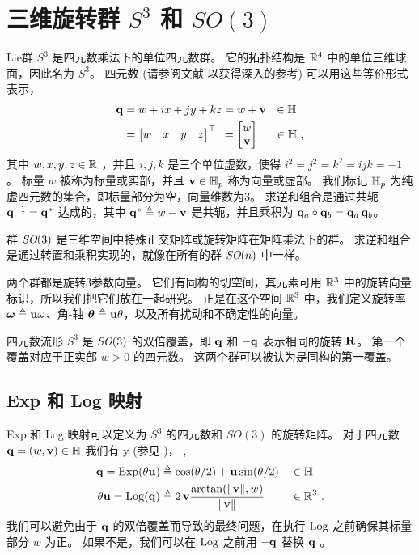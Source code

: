 
\section{三维旋转群 $S^3$ 和 $SO(3)$}
\label{sec:S3_SO3}

Lie群 $S^3$ 是四元数乘法下的单位四元数群。
它的拓扑结构是 ${\mathbb R}^4$ 中的单位三维球面，因此名为 $S^3$。
四元数 (请参阅文献 \cite{SOLA-17-Quaternion} 以获得深入的参考) 可以用这些等价形式表示，
%
\begin{align}
\begin{split}		
{\bf q} 
&= w+ix+jy+kz
=w+{\bf v} ~~ \in{\mathbb H}
\\
&
=\begin{bmatrix}w&x&y&z\end{bmatrix}^{\top} 
~\,=\begin{bmatrix}w\\{\bf v}\end{bmatrix} \quad~\, \in{\mathbb H}
~,
\end{split}
\end{align}
%
其中 $w,x,y,z\in{\mathbb R}$ ，并且 $i,j,k$ 是三个单位虚数，使得 $i^2=j^2=k^2=ijk=-1$ 。
标量 $w$ 被称为标量或实部，并且 ${\bf v}\in{\mathbb H}_p$ 称为向量或虚部。
我们标记 ${\mathbb H}_p$ 为纯虚四元数的集合，即标量部分为空，向量维数为3。
求逆和组合是通过共轭 ${\bf q}^{-1} = {\bf q}^*$ 达成的，其中 ${\bf q}^*\triangleq w-{\bf v}$ 是共轭，并且乘积为 ${\bf q}_a\circ{\bf q}_b = {\bf q}_a\,{\bf q}_b$。

群 $\textit{SO}(3)$ 是三维空间中特殊正交矩阵或旋转矩阵在矩阵乘法下的群。
求逆和组合是通过转置和乘积实现的，就像在所有的群 $\textit{SO}(n)$ 中一样。

两个群都是旋转$3$参数向量。 
它们有同构的切空间，其元素可用 ${\mathbb R}^3$ 中的旋转向量标识，所以我们把它们放在一起研究。
正是在这个空间 ${\mathbb R}^3$ 中，我们定义旋转率 ${{\bm \omega}}\triangleq{\bf u}\omega$、角-轴 ${{\bm \theta}}\triangleq{\bf u}\theta$，以及所有扰动和不确定性的向量。

四元数流形 $S^3$ 是 $\textit{SO}(3)$ 的双倍覆盖，即 ${\bf q}$ 和 $-{\bf q}$ 表示相同的旋转 ${\bf R}$。
第一个覆盖对应于正实部 $w>0$ 的四元数。
这两个群可以被认为是同构的第一覆盖。




\subsection{Exp 和 Log 映射}

Exp 和 Log 映射可以定义为 $S^3$ 的四元数和 $SO(3)$ 的旋转矩阵。
对于四元数 ${\bf q}=(w,{\bf v})\in{\mathbb H}$ 我们有%
%
\if \examples y (参见 )， \else, \fi
%
%
\begin{align}
{\bf q}= \operatorname*{Exp}(\theta{\bf u}) &\triangleq \cos(\theta/2) + {\bf u}\sin(\theta/2) &&\in{\mathbb H}\\ 
\theta{\bf u} = \operatorname*{Log}({\bf q}) &\triangleq 2\,{\bf v}\frac{\arctan({{\left\|{\bf v}\right\|},w})}{{\left\|{\bf v}\right\|}}&&\in{\mathbb R}^3
~.
\end{align}
%
我们可以避免由于 ${\bf q}$ 的双倍覆盖而导致的最终问题，在执行 $\operatorname*{Log}$ 之前确保其标量部分 $w$ 为正。
如果不是，我们可以在 $\operatorname*{Log}$ 之前用 $-{\bf q}$ 替换 ${\bf q}$ 。

